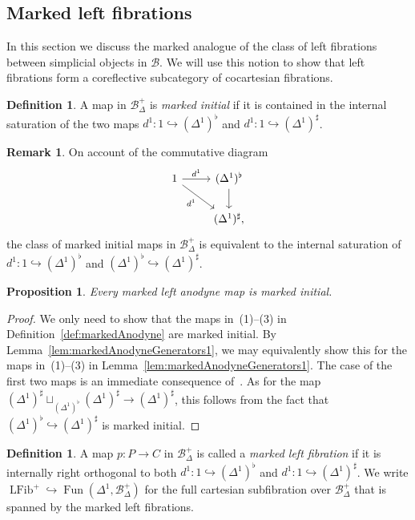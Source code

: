 \documentclass[reqno]{amsart}
\numberwithin{equation}{subsection}
\theoremstyle{plain}
\newtheorem{proposition}[equation]{Proposition}
\theoremstyle{definition}
\newtheorem{definition}[equation]{Definition}
\newtheorem{remark}[equation]{Remark}
\let\scr=\mathcal
\let\into=\hookrightarrow
\def\BB{\scr B}
\DeclareMathOperator{\LFib}{LFib}
\DeclareMathOperator{\Fun}{Fun}
\newcommand{\mSimp}[1]{#1_{\Delta}^+}
\begin{document}
\subsection{Marked left fibrations}
\label{sec:markedLeftFibrations}
In this section we discuss the marked analogue of the class of left fibrations between simplicial objects in $\BB$. We will use this notion to show that left fibrations form a coreflective subcategory of cocartesian fibrations.
\begin{definition}
	\label{def:markedInitial}
	A map in $\mSimp\BB$ is \emph{marked initial} if it is contained in the internal saturation of the two maps $d^1\colon 1\into (\Delta^1)^\flat$ and $d^1\colon 1\into (\Delta^1)^\sharp$.
\end{definition}
\begin{remark}
	\label{rem:markedInitialAlternativeDefinition}
	On account of the commutative diagram
	\begin{equation*}
	\begin{tikzcd}
	1\arrow[r, "d^1"]\arrow[dr, "d^1"']& (\Delta^1)^\flat\arrow[d]\\
	& (\Delta^1)^\sharp,
	\end{tikzcd}
	\end{equation*}
	the class of marked initial maps in $\mSimp\BB$ is equivalent to the internal saturation of $d^1\colon 1\into(\Delta^1)^\flat$ and $(\Delta^1)^\flat\into(\Delta^1)^\sharp$.
\end{remark}

\begin{proposition}
	\label{lem:markedInitialMarkedAnodyne}
	Every marked left anodyne map is marked initial.
\end{proposition}
\begin{proof}
	We only need to show that the maps in~(1)--(3) in Definition~\ref{def:markedAnodyne} are marked initial. By Lemma~\ref{lem:markedAnodyneGenerators1}, we may equivalently show this for the maps in~(1)--(3) in Lemma~\ref{lem:markedAnodyneGenerators1}. The case of the first two maps is an immediate consequence of~\cite[Lemma~4.1.4]{Martini2021}. As for the map $(\Delta^1)^\sharp\sqcup_{(\Delta^1)^\flat}(\Delta^1)^\sharp\to(\Delta^1)^\sharp$, this follows from the fact that $(\Delta^1)^\flat\into(\Delta^1)^\sharp$ is marked initial.
\end{proof}

\begin{definition}
	\label{def:markedRightFibration}
	A map $p\colon P\to C$ in $\mSimp\BB$ is called a \emph{marked left fibration} if it is internally right orthogonal to both $d^1\colon 1\into (\Delta^1)^\flat$ and $d^1\colon 1\into (\Delta^1)^\sharp$. We write $\LFib^+\into \Fun(\Delta^1,\mSimp\BB)$ for the full cartesian subfibration over $\mSimp\BB$ that is spanned by the marked left fibrations.
\end{definition}
\end{document}
